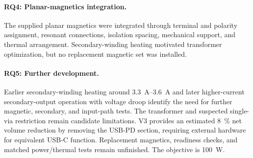 \paragraph{RQ4: Planar-magnetics integration.}
The supplied planar magnetics were integrated through terminal and
polarity assignment, resonant connections, isolation spacing, mechanical
support, and thermal arrangement. Secondary-winding heating motivated
transformer optimization, but no replacement magnetic set was installed.

\paragraph{RQ5: Further development.}
Earlier secondary-winding heating around \SIrange{3.3}{3.6}{\ampere} and later higher-current secondary-output operation with voltage droop identify the need for further magnetic, secondary, and input-path tests. The transformer and suspected single-via restriction remain candidate limitations. V3 provides an
estimated \SI{8}{\percent} net volume reduction by removing the USB-PD
section, requiring external hardware for equivalent USB-C function.
Replacement magnetics, readiness checks, and matched power/thermal tests
remain unfinished. The objective is \SI{100}{\watt}.
